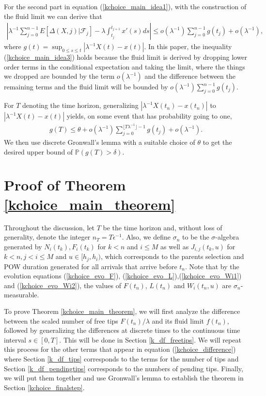 \documentclass[12pt]{article}
\def\P{\mathbb{P}}
\numberwithin{equation}{section}  %
\begin{document}
For the second part in equation (\ref{kchoice_main_idea1}), with the construction of the fluid limit we can derive that
\begin{align} 
\left|\lambda^{-1}\sum_{j=0}^{n-1} E[\Delta(X,j)|\mathcal{F}_{j}]-\lambda\int_{t_j}^{t_{j+1}}x'(s)ds \right|\leq o(\lambda^{-1})\sum_{j=0}^{n-1} g(t_j)+o(\lambda^{-1}),\label{kchoice_main_idea3}
\end{align}
where $g(t)=\sup_{0\leq s\leq t}|\lambda^{-1}X(t)-x(t)|$. In this paper, the inequality (\ref{kchoice_main_idea3}) holds because the fluid limit is derived by dropping lower order terms in the conditional expectation and taking the limit, where the things we dropped are bounded by the term $o(\lambda^{-1})$ and the difference between the remaining terms and the fluid limit will be bounded by $o(\lambda^{-1})\sum_{j=0}^{n-1}g(t_j)$.

For $T$ denoting the time horizon, generalizing $|\lambda^{-1}X(t_n)-x(t_n)|$ to $|\lambda^{-1}X(t)-x(t)|$ yields, on some event that has probability going to one, 
\begin{align*}
g(T)\leq \theta+o(\lambda^{-1})\sum_{j=0}^{\lfloor T\lambda^{-1}\rfloor-1} g(t_j)+o(\lambda^{-1}).
\end{align*}
We then use discrete Gronwall's lemma with a suitable choice of $\theta$ to get the desired upper bound of $\P\left(g(T)>\delta\right)$.

\section{Proof of Theorem \ref{kchoice_main_theorem}}\label{kchoice_main_proof}
Throughout the discussion, let $T$ be the time horizon and, without loss of generality, denote the integer $n_T=T\epsilon^{-1}$. Also, we define $\sigma_n$ to be the $\sigma$-algebra generated by $N_i(t_k),F_i(t_k)$ for $k< n$ and $i\leq M$ as well as $J_{i,j}(t_k,u)$ for $k< n,j<i\leq M$ and $u\in[h_j,h_i)$, which corresponds to the parents selection and POW duration generated for all arrivals that arrive before $t_n$. Note that by the evolution equations (\ref{kchoice_evo_F}), (\ref{kchoice_evo_L}),(\ref{kchoice_evo_Wi1}) and (\ref{kchoice_evo_Wi2}), the values of $F(t_n)$, $L(t_n)$ and $W_i(t_n,u)$ are $\sigma_{n}$-measurable.


To prove Theorem \ref{kchoice_main_theorem}, we will first analyze the difference between the scaled number of free tips $F(t_n)/\lambda$ and its fluid limit $f(t_n)$, followed by generalizing the differences at discrete times to the continuous time interval $s\in [0,T]$. This will be done in Section \ref{k_df_freetips}. We will repeat this process for the other terms that appear in equation (\ref{kchoice_difference}) where Section \ref{k_df_tips} corresponds to the terms for the number of tips and Section \ref{k_df_pendingtips} corresponds to the numbers of pending tips. Finally, we will put them together and use Gronwall's lemma to establish the theorem in Section \ref{kchoice_finalstep}. 
\end{document}
